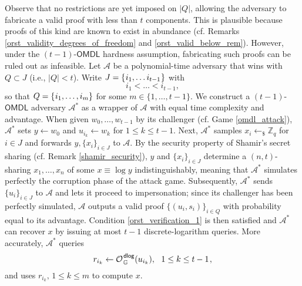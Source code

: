 \documentclass[10pt, psamsfonts, reqno]{amsart}
\theoremstyle{definition}
\theoremstyle{remark}
\numberwithin{equation}{section}
\begin{document}
Observe that no restrictions are yet imposed on $|Q|$,
allowing the adversary to fabricate
a valid proof with less than $t$ components.
This is plausible because proofs of this kind
are known to exist in abundance
(cf. Remarks \ref{orst_validity_degrees_of_freedom}
and \ref{orst_valid_below_rem}).
However, under the $(t-1)$-$\mathsf{OMDL}$ hardness assumption,
fabricating such proofs can be ruled out as infeasible.
Let $\mathcal{A}$ be a polynomial-time adversary
that wins with $Q \subset J$ (i.e., $|Q| < t$).
Write $J = \{\hspace{0.5pt}i_1, \dots i_{t-1}\hspace{0.5pt}\}$
with
\begin{equation*}
i_1 < \dots < i_{t-1},
\end{equation*}
so that
$Q = \{\hspace{0.5pt}i_1, \dots, i_m\}$
for some $m \in \{1, \dots, t-1\}$.
We construct a $(t-1)$-$\mathsf{OMDL}$ adversary
$\mathcal{A}^*$ as a wrapper of $\mathcal{A}$
with equal time complexity and advantage.
When given $w_0, \dots, w_{t-1}$ by its challenger
(cf. Game \ref{omdl_attack}),
$\mathcal{A}^*$ sets $y \leftarrow w_0$ and
$u_{i_k} \leftarrow w_k$ for $1 \le k \le t-1$.
Next, $\mathcal{A}^*$ samples
$x_i \leftarrow_\$ \mathbb{Z}_q$ for $i \in J$
and forwards $y, \{x_i\}_{i \in J}$ to $\mathcal{A}$.
By the security property of Shamir's secret sharing
(cf. Remark \ref{shamir_security}),
$y$ and $\{x_i\}_{i \in J}$
determine a $(n, t)$-sharing $x_1, \dots, x_n$
of some $x \equiv \log y$
indistinguishably, meaning that $\mathcal{A}^*$
simulates perfectly the corruption phase of the attack game.
Subsequently, $\mathcal{A}^*$ sends $\{u_i\}_{i \in J}$ to $\mathcal{A}$
and lets it proceed to impersonation;
since its challenger has been perfectly simulated,
$\mathcal{A}$ outputs a valid proof $\{(u_i, s_i)\}_{i \in Q}$
with probability equal to its advantage.
Condition \eqref{orst_verification_1}
is then satisfied and $\mathcal{A}^*$ can recover $x$ by issuing
at most $t-1$ discrete-logarithm queries.
More accurately, $\mathcal{A}^*$ queries
\vspace{5pt}
\begin{equation*}
r_{i_k} \leftarrow \mathcal{O}
	_{\hspace{1pt}\mathbb{G}}
	^{\hspace{1pt}\mathsf{dlog}}(u_{i_k}),
\ \ 1 \le k \le t-1
\hspace{1pt},
\vspace{5pt}
\end{equation*}
and uses $r_{i_k},\hspace{2pt} 1 \le k \le m$ to compute $x$.
\end{document}
